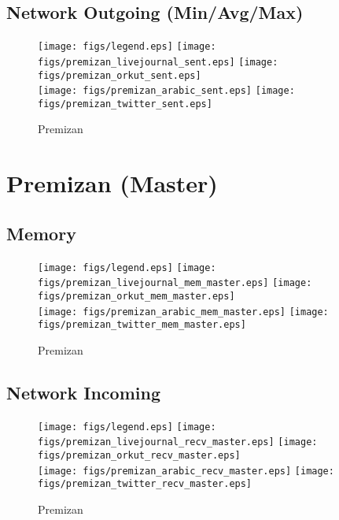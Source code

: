 \documentclass{article}
\newcommand{\bline}[1][1]{\vspace{#1\baselineskip}}
\begin{document}
\pagebreak
\subsection{Network Outgoing (Min/Avg/Max)}
\begin{figure}[!h]
  \bline[1]
  \centering
  \texttt{[image: figs/legend.eps]}\hspace{3em}%
  \texttt{[image: figs/premizan\_livejournal\_sent.eps]}\hspace{1em}%
  \texttt{[image: figs/premizan\_orkut\_sent.eps]}\\
  \texttt{[image: figs/premizan\_arabic\_sent.eps]}\hspace{1em}%
  \texttt{[image: figs/premizan\_twitter\_sent.eps]}
  \caption{Premizan}
\end{figure}


\pagebreak
\section{Premizan (Master)}
\label{sec:premizan-master}
\subsection{Memory}
\begin{figure}[!h]
  \centering
  \texttt{[image: figs/legend.eps]}\hspace{3em}%
  \texttt{[image: figs/premizan\_livejournal\_mem\_master.eps]}\hspace{1em}%
  \texttt{[image: figs/premizan\_orkut\_mem\_master.eps]}\\
  \texttt{[image: figs/premizan\_arabic\_mem\_master.eps]}\hspace{1em}%
  \texttt{[image: figs/premizan\_twitter\_mem\_master.eps]}
  \caption{Premizan}
\end{figure}

\pagebreak
\subsection{Network Incoming}
\begin{figure}[!h]
  \bline[1]
  \centering
  \texttt{[image: figs/legend.eps]}\hspace{3em}%
  \texttt{[image: figs/premizan\_livejournal\_recv\_master.eps]}\hspace{1em}%
  \texttt{[image: figs/premizan\_orkut\_recv\_master.eps]}\\
  \texttt{[image: figs/premizan\_arabic\_recv\_master.eps]}\hspace{1em}%
  \texttt{[image: figs/premizan\_twitter\_recv\_master.eps]}
  \caption{Premizan}
\end{figure}
\end{document}
